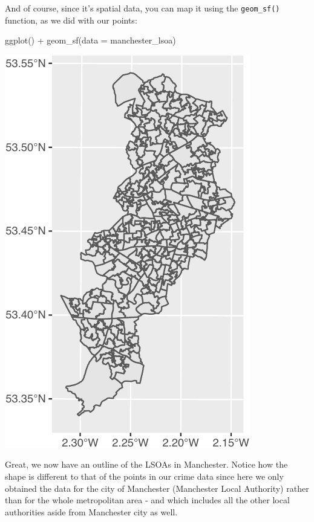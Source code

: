 \documentclass[
]{book}
\newenvironment{Shaded}{\begin{snugshade}}{\end{snugshade}}
\newcommand{\AttributeTok}[1]{\textcolor[rgb]{0.77,0.63,0.00}{#1}}
\newcommand{\FunctionTok}[1]{\textcolor[rgb]{0.00,0.00,0.00}{#1}}
\newcommand{\NormalTok}[1]{#1}
\newcommand{\SpecialCharTok}[1]{\textcolor[rgb]{0.00,0.00,0.00}{#1}}
\begin{document}
And of course, since it's spatial data, you can map it using the \texttt{geom\_sf()} function, as we did with our points:

\begin{Shaded}
\begin{Highlighting}[]
\FunctionTok{ggplot}\NormalTok{() }\SpecialCharTok{+} 
  \FunctionTok{geom\_sf}\NormalTok{(}\AttributeTok{data =}\NormalTok{ manchester\_lsoa)}
\end{Highlighting}
\end{Shaded}

\includegraphics{crime_mapping_files/figure-latex/unnamed-chunk-21-1.pdf}

Great, we now have an outline of the LSOAs in Manchester. Notice how the shape is different to that of the points in our crime data since here we only obtained the data for the city of Manchester (Manchester Local Authority) rather than for the whole metropolitan area - and which includes all the other local authorities aside from Manchester city as well.
\end{document}
